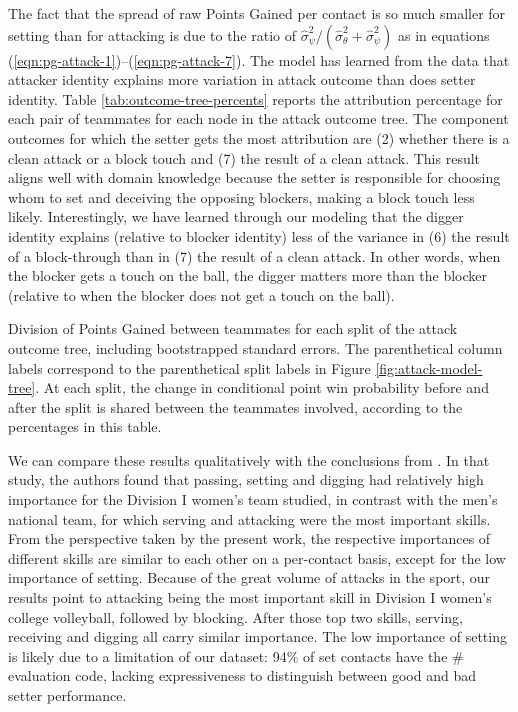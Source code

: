 \documentclass[USenglish]{article}
\theoremstyle{dgthm}
\theoremstyle{dgdef}
\begin{document}
The fact that the spread of raw Points Gained per contact is so much smaller for setting than for attacking is due to the ratio of $\hat\sigma^2_\psi / (\hat\sigma^2_\theta + \hat\sigma^2_\psi)$ as in equations (\ref{eqn:pg-attack-1})--(\ref{eqn:pg-attack-7}). The model has learned from the data that attacker identity explains more variation in attack outcome than does setter identity. Table \ref{tab:outcome-tree-percents} reports the attribution percentage for each pair of teammates for each node in the attack outcome tree. The component outcomes for which the setter gets the most attribution are (2) whether there is a clean attack or a block touch and (7) the result of a clean attack. This result aligns well with domain knowledge because the setter is responsible for choosing whom to set and deceiving the opposing blockers, making a block touch less likely. Interestingly, we have learned through our modeling that the digger identity explains (relative to blocker identity) less of the variance in (6) the result of a block-through than in (7) the result of a clean attack. In other words, when the blocker gets a touch on the ball, the digger matters more than the blocker (relative to when the blocker does not get a touch on the ball).

\begin{table}
    \centering
    
    \caption{Division of Points Gained between teammates for each split of the attack outcome tree, including bootstrapped standard errors. The parenthetical column labels correspond to the parenthetical split labels in Figure \ref{fig:attack-model-tree}. At each split, the change in conditional point win probability before and after the split is shared between the teammates involved, according to the percentages in this table.}
    \label{tab:outcome-tree-percents}
\end{table}

  We can compare these results qualitatively with the conclusions from \textcite{miskin_etal_2010}. In that study, the authors found that passing, setting and digging had relatively high importance for the Division I women's team studied, in contrast with the men's national team, for which serving and attacking were the most important skills. From the perspective taken by the present work, the respective importances of different skills are similar to each other on a per-contact basis, except for the low importance of setting. Because of the great volume of attacks in the sport, our results point to attacking being the most important skill in Division I women's college volleyball, followed by blocking. After those top two skills, serving, receiving and digging all carry similar importance. The low importance of setting is likely due to a limitation of our dataset: 94\% of set contacts have the \# evaluation code, lacking expressiveness to distinguish between good and bad setter performance.
\end{document}
